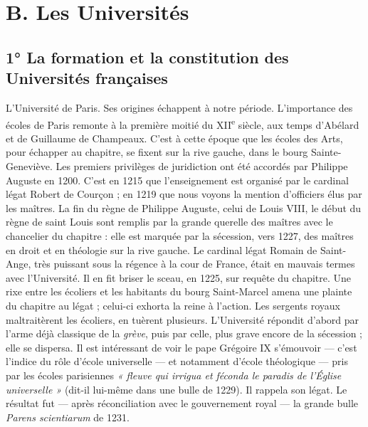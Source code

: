 \documentclass[french,twoside]{book} %
\begin{document}
\section[B. Les Universités]{B. Les Universités}
\label{c11b}
\subsection[1° La formation et la constitution des Universités françaises]{1° La formation et la constitution des Universités françaises}
\noindent L’Université de Paris. Ses origines échappent à notre période. L’importance des écoles de Paris remonte à la première moitié du XII\textsuperscript{e} siècle, aux temps d’Abélard et de Guillaume de Champeaux. C’est à cette époque que les écoles des Arts, pour échapper au chapitre, se fixent sur la rive gauche, dans le bourg Sainte-Geneviève. Les premiers privilèges de juridiction ont été accordés par Philippe Auguste en 1200. C’est en 1215 que l’enseignement est organisé par le cardinal légat Robert de Courçon ; en 1219 que nous voyons la mention d’officiers élus par les maîtres. La fin du règne de Philippe Auguste, celui de Louis VIII, le début du règne de saint Louis sont remplis par la grande querelle des maîtres avec le chancelier du chapitre : elle est marquée par la sécession, vers 1227, des maîtres en droit et en théologie sur la rive gauche. Le cardinal légat Romain de Saint-Ange, très puissant sous la régence à la cour de France, était en mauvais termes avec l’Université. Il en fit briser le sceau, en 1225, sur requête du chapitre. Une rixe entre les écoliers et les habitants du bourg Saint-Marcel amena une plainte du chapitre au légat ; celui-ci exhorta la reine à l’action. Les sergents royaux maltraitèrent les écoliers, en tuèrent plusieurs. L’Université répondit d’abord par l’arme déjà classique de la \emph{grève}, puis par celle, plus grave encore de la sécession ; elle se dispersa. Il est intéressant de voir le pape Grégoire IX s’émouvoir — c’est l’indice du rôle d’école universelle — et notamment d’école théologique — pris par les écoles parisiennes \emph{« fleuve qui irrigua et féconda le paradis de l’Église universelle »} (dit-il lui-même dans une bulle de 1229). Il rappela son légat. Le résultat fut — après réconciliation avec le gouvernement royal — la grande bulle {\itshape Parens scientiarum} de 1231.\par
\end{document}
